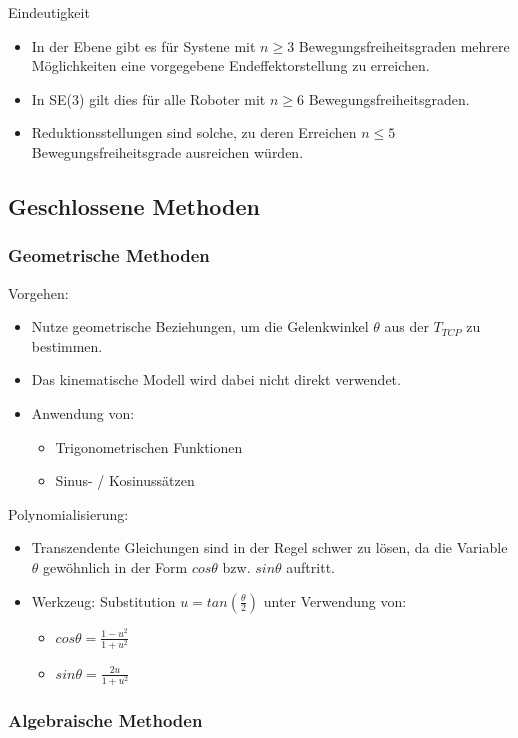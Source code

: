 \documentclass[paper=a4, fontsize=11pt]{scrartcl} %
\numberwithin{equation}{section} %
\numberwithin{figure}{section} %
\numberwithin{table}{section} %
\begin{document}
Eindeutigkeit
\begin{itemize}
\item In der Ebene gibt es für Systene mit $n \ge 3$ Bewegungsfreiheitsgraden mehrere Möglichkeiten eine vorgegebene Endeffektorstellung zu erreichen.
\item In SE(3) gilt dies für alle Roboter mit $n \ge 6$ Bewegungsfreiheitsgraden.
\item Reduktionsstellungen sind solche, zu deren Erreichen $n \leq 5$ Bewegungsfreiheitsgrade ausreichen würden.
\end{itemize}

\subsection{Geschlossene Methoden}

\subsubsection{Geometrische Methoden}

Vorgehen:
\begin{itemize}
\item Nutze geometrische Beziehungen, um die Gelenkwinkel $\theta$ aus der $T_{TCP}$ zu bestimmen.
\item Das kinematische Modell wird dabei nicht direkt verwendet.
\item Anwendung von:
\begin{itemize}
\item Trigonometrischen Funktionen
\item Sinus- / Kosinussätzen
\end{itemize}
\end{itemize}

Polynomialisierung:
\begin{itemize}
\item Transzendente Gleichungen sind in der Regel schwer zu lösen, da die Variable $\theta$ gewöhnlich in der Form $cos \theta$ bzw. $sin \theta$ auftritt.
\item Werkzeug: Substitution $u = tan(\frac{\theta}{2})$ unter Verwendung von:
\begin{itemize}
\item $cos \theta = \frac{1-u^2}{1+u^2}$
\item $sin \theta = \frac{2u}{1+u^2}$
\end{itemize}
\end{itemize}

\subsubsection{Algebraische Methoden}
\end{document}
